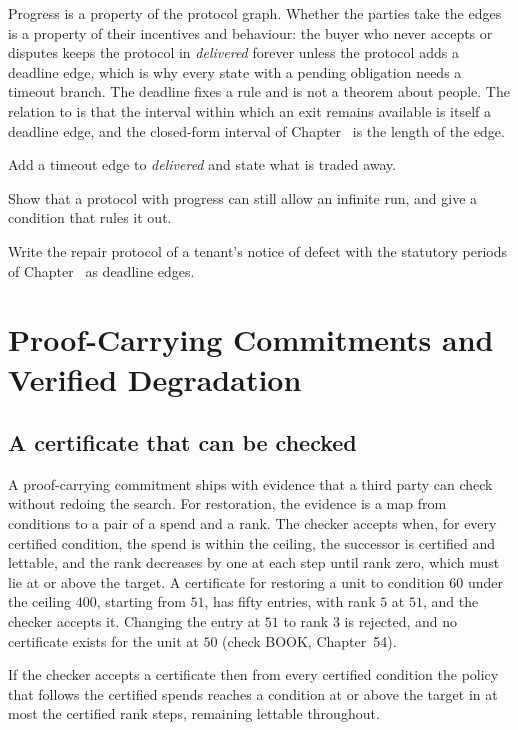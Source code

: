 Progress is a property of the protocol graph. Whether the parties take the edges is a property of their incentives and behaviour: the buyer who never accepts or disputes keeps the protocol in \emph{delivered} forever unless the protocol adds a deadline edge, which is why every state with a pending obligation needs a timeout branch. The deadline fixes a rule and is not a theorem about people. The relation to  is that the interval within which an exit remains available is itself a deadline edge, and the closed-form interval of Chapter~ is the length of the edge.

\begin{exercise}Add a timeout edge to \emph{delivered} and state what is traded away.\end{exercise}
\begin{exercise}Show that a protocol with progress can still allow an infinite run, and give a condition that rules it out.\end{exercise}
\begin{exercise}Write the repair protocol of a tenant's notice of defect with the statutory periods of Chapter~ as deadline edges.\end{exercise}

\chapter{Proof-Carrying Commitments and Verified Degradation}\label{ch:54}

\section{A certificate that can be checked}

A proof-carrying commitment ships with evidence that a third party can check without redoing the search. For restoration, the evidence is a map from conditions to a pair of a spend and a rank. The checker accepts when, for every certified condition, the spend is within the ceiling, the successor is certified and lettable, and the rank decreases by one at each step until rank zero, which must lie at or above the target. A certificate for restoring a unit to condition $60$ under the ceiling $400$, starting from $51$, has fifty entries, with rank $5$ at $51$, and the checker accepts it. Changing the entry at $51$ to rank $3$ is rejected, and no certificate exists for the unit at $50$ (check BOOK, Chapter~54).

\begin{proposition}\label{prop:rank}
If the checker accepts a certificate then from every certified condition the policy that follows the certified spends reaches a condition at or above the target in at most the certified rank steps, remaining lettable throughout.
\end{proposition}

